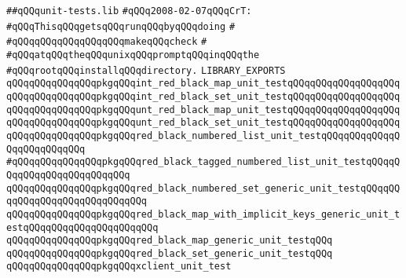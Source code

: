 \label{src/lib/test/unit-tests.lib}
\verb|##qQQqunit-tests.lib|\newline
\newline
\verb|#qQQq2008-02-07qQQqCrT:|\newline
\verb|#qQQqThisqQQqgetsqQQqrunqQQqbyqQQqdoing|\newline
\verb|#|\newline
\verb|#qQQqqQQqqQQqqQQqqQQqmakeqQQqcheck|\newline
\verb|#|\newline
\verb|#qQQqatqQQqtheqQQqunixqQQqpromptqQQqinqQQqthe|\newline
\verb|#qQQqrootqQQqinstallqQQqdirectory.|\newline
\newline
\newline
\newline
\verb|LIBRARY_EXPORTS|\newline
\newline
\verb|qQQqqQQqqQQqqQQqpkgqQQqint_red_black_map_unit_testqQQqqQQqqQQqqQQqqQQq|\newline
\verb|qQQqqQQqqQQqqQQqpkgqQQqint_red_black_set_unit_testqQQqqQQqqQQqqQQqqQQq|\newline
\newline
\verb|qQQqqQQqqQQqqQQqpkgqQQqunt_red_black_map_unit_testqQQqqQQqqQQqqQQqqQQq|\newline
\verb|qQQqqQQqqQQqqQQqpkgqQQqunt_red_black_set_unit_testqQQqqQQqqQQqqQQqqQQq|\newline
\newline
\verb|qQQqqQQqqQQqqQQqpkgqQQqred_black_numbered_list_unit_testqQQqqQQqqQQqqQQqqQQqqQQqqQQq|\newline
\verb|#qQQqqQQqqQQqqQQqpkgqQQqred_black_tagged_numbered_list_unit_testqQQqqQQqqQQqqQQqqQQqqQQqqQQq|\newline
\verb|qQQqqQQqqQQqqQQqpkgqQQqred_black_numbered_set_generic_unit_testqQQqqQQqqQQqqQQqqQQqqQQqqQQqqQQq|\newline
\newline
\verb|qQQqqQQqqQQqqQQqpkgqQQqred_black_map_with_implicit_keys_generic_unit_testqQQqqQQqqQQqqQQqqQQqqQQq|\newline
\newline
\verb|qQQqqQQqqQQqqQQqpkgqQQqred_black_map_generic_unit_testqQQq|\newline
\verb|qQQqqQQqqQQqqQQqpkgqQQqred_black_set_generic_unit_testqQQq|\newline
\newline
\verb|qQQqqQQqqQQqqQQqpkgqQQqxclient_unit_test|\newline
